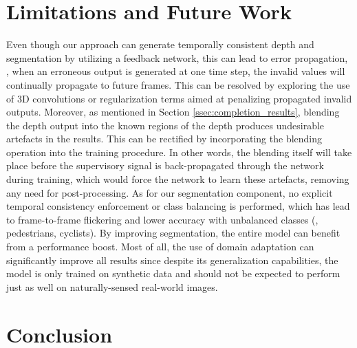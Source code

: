 \documentclass[10pt,twocolumn,letterpaper]{article}
\begin{document}
{\section{Limitations and Future Work}
\label{sec:limits}\vspace{-0.05cm}

Even though our approach can generate temporally consistent depth and segmentation by utilizing a feedback network, this can lead to error propagation, \ie, when an erroneous output is generated at one time step, the invalid values will continually propagate to future frames. This can be resolved by exploring the use of 3D convolutions or regularization terms aimed at penalizing propagated invalid outputs. Moreover, as mentioned in Section \ref{ssec:completion_results}, blending the depth output into the known regions of the depth \cite{perez2003poisson} produces undesirable artefacts in the results. This can be rectified by incorporating the blending operation into the training procedure. In other words, the blending itself will take place before the supervisory signal is back-propagated through the network during training, which would force the network to learn these artefacts, removing any need for post-processing. As for our segmentation component, no explicit temporal consistency enforcement or class balancing is performed, which has lead to frame-to-frame flickering and lower accuracy with unbalanced classes (\eg, pedestrians, cyclists). By improving segmentation, the entire model can benefit from a performance boost. Most of all, the use of domain adaptation \cite{atapour2018real, hoffman2018cycada} can significantly improve all results since despite its generalization capabilities, the model is only trained on synthetic data and should not be expected to perform just as well on naturally-sensed real-world images.\vspace{-0.1cm}

\section{Conclusion}
\label{sec:conclusion}\vspace{-0.1cm}

}
\end{document}
